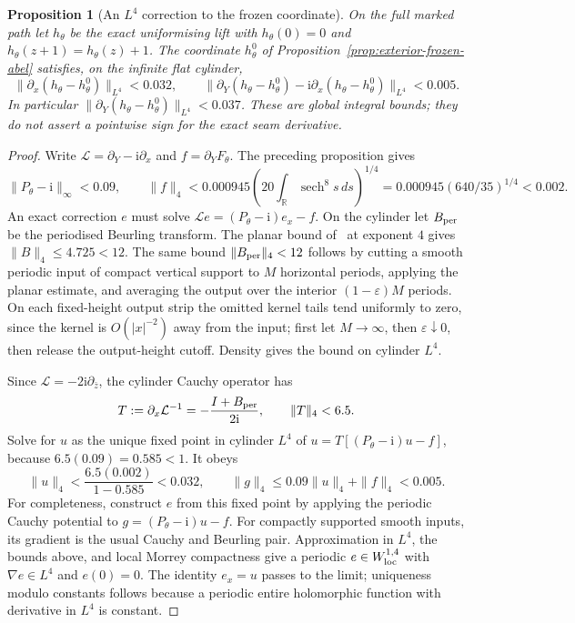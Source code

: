 \documentclass[11pt,a4paper]{article}
\newtheorem{proposition}[theorem]{Proposition}
\theoremstyle{definition}
\newcommand{\ii}{\mathrm{i}}
\begin{document}
\begin{proposition}[An $L^4$ correction to the frozen coordinate]
\label{prop:exterior-frozen-correction}
On the full marked path let $h_\theta$ be the exact uniformising
lift with $h_\theta(0)=0$ and
$h_\theta(z+1)=h_\theta(z)+1$.  The coordinate $h^0_\theta$
of Proposition~\ref{prop:exterior-frozen-abel} satisfies, on the
infinite flat cylinder,
\[
 \|\partial_x(h_\theta-h^0_\theta)\|_{L^4}<0.032,
 \qquad
 \|\partial_Y(h_\theta-h^0_\theta)
       -\ii\partial_x(h_\theta-h^0_\theta)\|_{L^4}<0.005.
\]
In particular
$\|\partial_Y(h_\theta-h^0_\theta)\|_{L^4}<0.037$.
These are global integral bounds; they do not assert a pointwise
sign for the exact seam derivative.
\end{proposition}

\begin{proof}
Write $\mathcal L=\partial_Y-\ii\partial_x$ and
$f=\partial_YF_\theta$.  The preceding proposition gives
\[
 \|P_\theta-\ii\|_\infty<0.09,
 \qquad
 \|f\|_4<0.000945
       \left(20\int_{\mathbb R}\!\operatorname{sech}^8s\,ds\right)^{1/4}
       =0.000945(640/35)^{1/4}<0.002.
\]
An exact correction $e$ must solve
$\mathcal Le=(P_\theta-\ii)e_x-f$.
On the cylinder let $B_{\rm per}$ be the periodised Beurling
transform.  The planar bound of~\cite[Thm.~1.2]{BanuelosJanakiraman}
at exponent $4$ gives $\|B\|_4\le4.725<12$.
The same bound $\|B_{\rm per}\|_4<12$ follows by cutting a smooth
periodic input of compact vertical support to $M$ horizontal periods,
applying the planar estimate, and averaging the output over the
interior $(1-\varepsilon)M$ periods.  On each fixed-height output
strip the omitted kernel tails tend uniformly to zero, since the
kernel is $O(|x|^{-2})$ away from the input; first let $M\to\infty$,
then $\varepsilon\downarrow0$, then release the output-height cutoff.
Density gives the bound on cylinder $L^4$.

Since $\mathcal L=-2\ii\partial_{\bar z}$, the cylinder
Cauchy operator has
\[
 T:=\partial_x\mathcal L^{-1}
   =-\frac{I+B_{\rm per}}{2\ii},
 \qquad \|T\|_4<6.5.
\]
Solve for $u$ as the unique fixed point in cylinder $L^4$ of
$u=T[(P_\theta-\ii)u-f]$, because $6.5(0.09)=0.585<1$.
It obeys
\[
 \|u\|_4<\frac{6.5(0.002)}{1-0.585}<0.032,
 \qquad
 \|g\|_4
 \le0.09\|u\|_4+\|f\|_4<0.005.
\]
For completeness, construct $e$ from this fixed point by applying
the periodic Cauchy potential to
$g=(P_\theta-\ii)u-f$.  For compactly supported smooth inputs,
its gradient is the usual Cauchy and Beurling pair.  Approximation
in $L^4$, the bounds above, and local Morrey compactness give a
periodic $e\in W^{1,4}_{\rm loc}$ with $\nabla e\in L^4$ and
$e(0)=0$.  The identity $e_x=u$ passes to the limit; uniqueness
modulo constants follows because a periodic entire holomorphic
function with derivative in $L^4$ is constant.


\end{proof}
\end{document}
